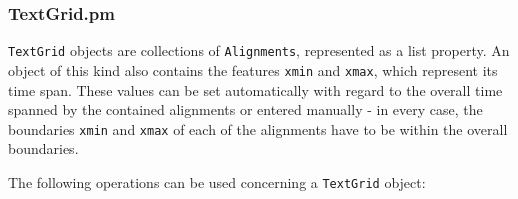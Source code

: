 \documentclass[a4,twoside=off,draft=true]{scrartcl}
\begin{document}
\subsubsection{TextGrid.pm}
{\tt TextGrid} objects are collections of {\tt Alignments}, represented as a list property. 
An object of this kind also contains the features {\tt xmin} and {\tt xmax}, which represent its time span. 
These values can be set automatically with regard to the overall time spanned by the contained alignments or entered manually - in every case, the boundaries {\tt xmin} and {\tt xmax} of each of the alignments have to be within the overall boundaries. 

The following operations can be used concerning a {\tt TextGrid} object: 
\end{document}

